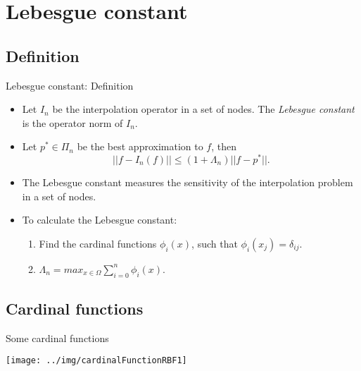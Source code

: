 \documentclass{beamer}
\begin{document}
\section{Lebesgue constant}
\subsection{Definition}
\begin{frame}{Lebesgue constant: Definition}
  \begin{itemize}
    \item Let $I_n$ be the interpolation operator in a set of nodes. The 
      \emph{Lebesgue constant} is the operator norm of $I_n$.

    \item Let $p^* \in \Pi_n$ be the best approximation to $f$, then
      \begin{equation*}
	||f - I_n(f)|| \le (1 + \Lambda_n) ||f - p^*||.
      \end{equation*}

    \item The Lebesgue constant measures the sensitivity of the interpolation
      problem in a set of nodes.

    \item To calculate the Lebesgue constant:
      \begin{enumerate}
        \item Find the cardinal functions $\phi_i(x)$, such that $\phi_i(x_j) = 
	  \delta_{ij}$.
	\item $\Lambda_n = max_{x \in \Omega}\sum_{i=0}^n \phi_i(x)$.
      \end{enumerate}
  \end{itemize}
\end{frame}

\subsection{Cardinal functions}
\begin{frame}{Some cardinal functions}
  \begin{center}
    \texttt{[image: ../img/cardinalFunctionRBF1]}
  \end{center}
\end{frame}
\end{document}
